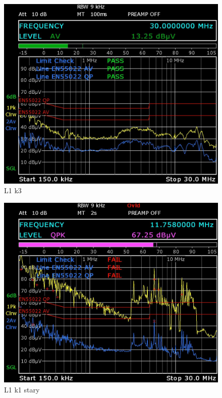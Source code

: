 \documentclass[12pt, a4paper, oneside]{article}
\begin{document}
\begin{figure}[h]
\centering
\caption{L1 k3}
\includegraphics[scale=0.28]{Linia1/k3.png}
\end{figure}
\begin{figure}[h]
\centering
\caption{L1 k1 stary}
\includegraphics[scale=0.28]{Linia1/stary_k1.png}
\end{figure}
\clearpage
\end{document}
